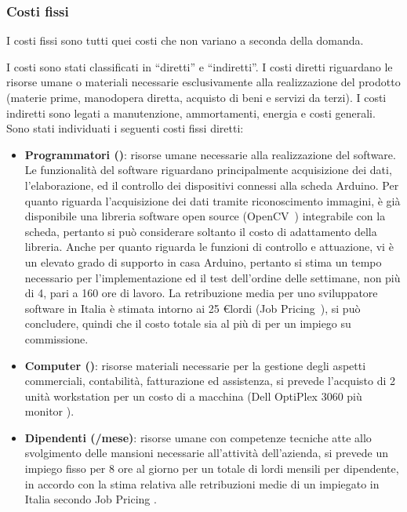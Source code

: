 \subsubsection{Costi fissi}
I costi fissi sono tutti quei costi che non variano a seconda della domanda.

I costi sono stati classificati in “diretti” e “indiretti”. I costi diretti
riguardano le risorse umane o materiali necessarie esclusivamente alla
realizzazione del prodotto (materie prime, manodopera diretta, acquisto di beni
e servizi da terzi). I costi indiretti sono legati a manutenzione, ammortamenti,
energia e costi generali.\\
%
Sono stati individuati i seguenti costi fissi diretti:
\begin{itemize}
\item \textbf{Programmatori ()}: risorse umane necessarie alla
realizzazione del software.  Le funzionalità del software riguardano
principalmente acquisizione dei dati, l’elaborazione, ed il controllo dei
dispositivi connessi alla scheda Arduino.  Per quanto riguarda l’acquisizione
dei dati tramite riconoscimento immagini, è già disponibile una libreria
software open source (OpenCV~\cite{opencv}) integrabile con la scheda, pertanto
si può considerare soltanto il costo di adattamento della libreria. Anche per
quanto riguarda le funzioni di controllo e attuazione, vi è un elevato grado di
supporto in casa Arduino, pertanto si stima un tempo necessario per
l’implementazione ed il test dell’ordine delle settimane, non più di 4, pari a
160 ore di lavoro. La retribuzione media per uno sviluppatore software in Italia
è stimata intorno ai 25 \euro lordi (Job Pricing~\cite{corcom}), si può
concludere, quindi che il costo totale sia al più di  per un impiego
su commissione. 
\item \textbf{Computer ()}: risorse materiali
necessarie per la gestione degli aspetti commerciali, contabilità, fatturazione
ed assistenza, si prevede l’acquisto di 2 unità workstation per un costo di
 a macchina (Dell OptiPlex 3060 più monitor \cite{dell}).  
\item \textbf{Dipendenti (/mese)}: risorse umane con competenze
tecniche atte allo svolgimento delle mansioni necessarie all’attività
dell’azienda, si prevede un impiego fisso per 8 ore al giorno per un totale di
 lordi mensili per dipendente, in accordo con la stima relativa alle
retribuzioni medie di un impiegato in Italia secondo Job Pricing \cite{money}.
\end{itemize}
